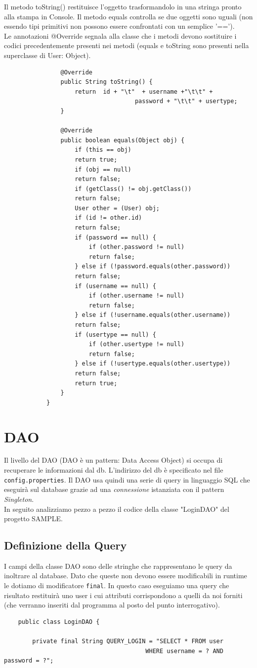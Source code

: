 \documentclass[a4paper,12 pt]{article}
\begin{document}
				Il metodo toString() restituisce l'oggetto trasformandolo in una stringa pronto alla stampa in Console. Il metodo equals controlla se due oggetti sono uguali (non essendo tipi primitivi non possono essere confrontati con un semplice '==').\\
				
				 Le annotazioni @Override segnala alla classe che i metodi devono sostituire i codici precedentemente presenti nei metodi (equals e toString sono presenti nella superclasse di User: Object).
				\begin{lstlisting}
				@Override
				public String toString() {
					return  id + "\t"  + username +"\t\t" +  
									 password + "\t\t" + usertype;
				}
				
				@Override
				public boolean equals(Object obj) {
					if (this == obj)
					return true;
					if (obj == null)
					return false;
					if (getClass() != obj.getClass())
					return false;
					User other = (User) obj;
					if (id != other.id)
					return false;
					if (password == null) {
						if (other.password != null)
						return false;
					} else if (!password.equals(other.password))
					return false;
					if (username == null) {
						if (other.username != null)
						return false;
					} else if (!username.equals(other.username))
					return false;
					if (usertype == null) {
						if (other.usertype != null)
						return false;
					} else if (!usertype.equals(other.usertype))
					return false;
					return true;
				}
			}
			\end{lstlisting}
	
	
	\section{DAO}
	Il livello del DAO (DAO è un pattern: Data Access Object) si occupa di recuperare le informazioni dal db. L'indirizzo del db è specificato nel file \texttt{config.properties}.
	Il DAO usa quindi una serie di query in linguaggio SQL che eseguirà sul database grazie ad una \textit{connessione} istanziata con il pattern \textit{Singleton}.\\
	
	In seguito analizziamo pezzo a pezzo il codice della classe "LoginDAO" del progetto SAMPLE.
	
	\subsection{Definizione della Query}
	I campi della classe DAO sono delle stringhe che rappresentano le query da inoltrare al database. Dato che queste non devono essere modificabili in runtime le dotiamo di modificatore \texttt{final}. In questo caso eseguiamo una query che risultato restituirà uno user i cui attributi corrispondono a quelli da noi forniti (che verranno inseriti dal programma al posto del punto interrogativo).
	\begin{lstlisting}
	public class LoginDAO {
		
		private final String QUERY_LOGIN = "SELECT * FROM user 
										WHERE username = ? AND password = ?";
	\end{lstlisting}
	
\end{document}
